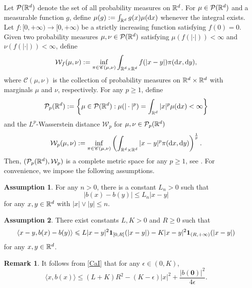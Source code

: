 \documentclass[aap]{imsart}
\theoremstyle{plain}
\theoremstyle{definition}
\newtheorem{remark}{Remark}
\newtheorem{assumption}{Assumption}
\begin{document}
Let $\mathcal{P}(\mathbb{R}^{d})$ denote the set of all  probability measures on $\mathbb{R}^{d}$.
For $\mu\in \mathcal{P}(\mathbb{R}^d)$ and a measurable function $g$, define $\mu(g):=\int_{\mathbb{R}^d}g(x)\mu(\mathrm{d} x)$ whenever the integral exists. 
Let $f:[0, +\infty)\rightarrow [0, +\infty)$ be a strictly increasing function satisfying $f(0) = 0$.
Given two probability measures $\mu, \nu\in\mathcal{P}(\mathbb{R}^d)$ satisfying \(\mu(f(|\cdot|))<\infty\) and \(\nu(f(|\cdot|))<\infty\), define 
$$\mathcal{W}_f(\mu, \nu):= \inf_{\mathbf{\pi}\in \mathscr{C}(\mu, \nu)}\int_{\mathbb{R}^d\times \mathbb{R}^d} f(|x-y|)\mathbf{\pi}(\mathrm{d} x, \mathrm{d} y),$$
where $\mathscr{C}(\mu, \nu)$ is the collection of probability measures on $\mathbb{R}^d\times \mathbb{R}^d$ with marginals $\mu$ and $\nu$, respectively. 
For any $p\geqslant 1$, define
$$\mathcal{P}_p(\mathbb{R}^d):=\left\{\mu \in \mathcal{P}(\mathbb{R}^{d}) : \mu(|\cdot|^p)=\int_{\mathbb{R}^{d}}|x|^p\mu(\mathrm{d}x)<\infty\right\} $$
and the $L^p$-Wasserstein distance $\mathcal{W}_p$  for $\mu, \nu\in\mathcal{P}_p(\mathbb{R}^d)$
$$\mathcal{W}_p(\mu, \nu):= \inf_{\mathbf{\pi}\in \mathscr{C}(\mu, \nu)}\left(\int_{\mathbb{R}^d\times \mathbb{R}^d} |x-y|^p\mathbf{\pi}(\mathrm{d} x, \mathrm{d} y)\right)^{\frac{1}{p}}.$$
Then, $(\mathcal{P}_p(\mathbb{R}^d),\mathcal{W}_p)$ is a complete metric space for any $p\geqslant 1$, see \cite{Chen}.
For convenience, we impose the following assumptions.
\begin{assumption}\label{A}
For any $n>0$, there is a  constant $L_n>0$ such that 
\begin{equation}\label{LL}
|b(x)-b(y)|\leqslant L_n|x-y|
\end{equation}
for any $x, y\in\mathbb{R}^d$ with $|x|\vee|y|\leqslant n$.     
\end{assumption}
\begin{assumption}\label{A1}
There exist constants $L, K>0$ and $R\geqslant 0$ such that 
\begin{equation}\label{CaI}
	\langle x-y, b(x)-b(y)\rangle \leqslant L|x-y|^2 {\bf{1}}_{[0, R]}(|x-y|)-K|x-y|^2{\bf 1}_{(R, +\infty)}(|x-y|) 
\end{equation}
for any $x, y\in\mathbb{R}^d$.
\end{assumption}
\begin{remark}\label{Re0}
It follows from \eqref{CaI} that for any $\epsilon\in(0, K)$,
\begin{equation*}
\langle x, b(x)\rangle
\leqslant(L+K)R^2-(K-\epsilon)|x|^2+\frac{|b(\mathbf{0})|^2}{4\epsilon}.
\end{equation*}
\end{remark}
\end{document}
